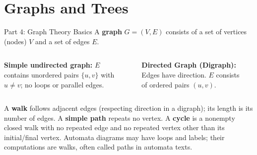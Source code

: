 \documentclass[10pt]{beamer}
\begin{document}
\section{Graphs and Trees}

\begin{frame}{Part 4: Graph Theory Basics}
  \small
  A \textbf{graph} $G = (V, E)$ consists of a set of vertices (nodes) $V$ and a set of edges $E$.
  \vspace{5mm}
  \pause
  \begin{columns}
    \textbf{Simple undirected graph:} $E$ contains unordered pairs
    $\{u,v\}$ with $u\ne v$; no loops or parallel edges.
    \begin{center}
    \end{center}
    
    \textbf{Directed Graph (Digraph):} Edges have direction. $E$ consists of ordered pairs $(u, v)$.
    \begin{center}
    \end{center}
  \end{columns}
  \vspace{0.2cm}
  A \textbf{walk} follows adjacent edges (respecting direction in a digraph);
  its length is its number of edges. A \textbf{simple path} repeats no vertex.
  A \textbf{cycle} is a nonempty closed walk with no repeated edge and no
  repeated vertex other than its initial/final vertex. Automata diagrams may have loops and labels;
  their computations are walks, often called paths in automata texts.
\end{frame}
\end{document}
